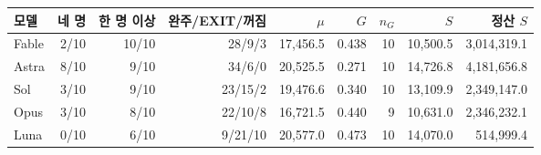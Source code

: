 \begin{tabular}{@{}lrrrrrrrr@{}}
\toprule
모델 & 네 명 & 한 명 이상 & 완주/EXIT/꺼짐 & $\mu$ & $G$ & $n_G$ & $S$ & 정산 $S$ \\
\midrule
Fable & 2/10 & 10/10 & 28/9/3 & 17,456.5 & 0.438 & 10 & 10,500.5 & 3,014,319.1 \\
Astra & 8/10 & 9/10 & 34/6/0 & 20,525.5 & 0.271 & 10 & 14,726.8 & 4,181,656.8 \\
Sol & 3/10 & 9/10 & 23/15/2 & 19,476.6 & 0.340 & 10 & 13,109.9 & 2,349,147.0 \\
Opus & 3/10 & 8/10 & 22/10/8 & 16,721.5 & 0.440 & 9 & 10,631.0 & 2,346,232.1 \\
Luna & 0/10 & 6/10 & 9/21/10 & 20,577.0 & 0.473 & 10 & 14,070.0 & 514,999.4 \\
\bottomrule
\end{tabular}
